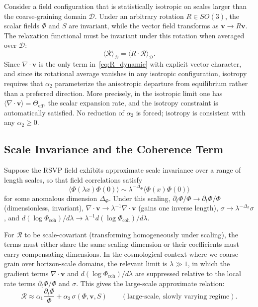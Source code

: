 \documentclass[12pt,a4paper]{article}
\theoremstyle{remark}
\newcommand{\vv}{\mathbf{v}}
\newcommand{\Rcal}{\mathcal{R}}
\begin{document}
Consider a field configuration that is statistically isotropic on scales
larger than the coarse-graining domain $\mathcal{D}$. Under an arbitrary
rotation $R \in SO(3)$, the scalar fields $\Phi$ and $S$ are invariant,
while the vector field transforms as $\vv \to R\vv$. The relaxation functional
must be invariant under this rotation when averaged over $\mathcal{D}$:
\begin{equation}
\langle \Rcal \rangle_{\mathcal{D}} = \langle R\cdot\Rcal \rangle_{\mathcal{D}}.
\end{equation}
Since $\nabla \cdot \vv$ is the only term in~\eqref{eq:R_dynamic} with explicit
vector character, and since its rotational average vanishes in any isotropic
configuration, isotropy requires that $\alpha_2$ parameterize the anisotropic
departure from equilibrium rather than a preferred direction. More precisely,
in the isotropic limit one has $\langle \nabla \cdot \vv \rangle = \Theta_{\mathrm{eff}}$,
the scalar expansion rate, and the isotropy constraint is automatically
satisfied. No reduction of $\alpha_2$ is forced; isotropy is consistent with
any $\alpha_2 \ge 0$.

\subsection{Scale Invariance and the Coherence Term}

Suppose the RSVP field exhibits approximate scale invariance over a range of
length scales, so that field correlations satisfy
\begin{equation}
\langle \Phi(\lambda x) \Phi(0) \rangle \sim \lambda^{-\Delta_\Phi}
\langle \Phi(x)\Phi(0) \rangle
\end{equation}
for some anomalous dimension $\Delta_\Phi$. Under this scaling,
$\partial_t\Phi/\Phi \to \partial_t\Phi/\Phi$ (dimensionless, invariant),
$\nabla\cdot\vv \to \lambda^{-1}\nabla\cdot\vv$ (gains one inverse length),
$\sigma \to \lambda^{-\Delta_\sigma}\sigma$, and $d(\log\Phi_{\mathrm{coh}})/d\lambda
\to \lambda^{-1}d(\log\Phi_{\mathrm{coh}})/d\lambda$.

For $\Rcal$ to be scale-covariant (transforming homogeneously under scaling),
the terms must either share the same scaling dimension or their coefficients
must carry compensating dimensions. In the cosmological context where we
coarse-grain over horizon-scale domains, the relevant limit is $\lambda \gg 1$,
in which the gradient terms $\nabla\cdot\vv$ and $d(\log\Phi_{\mathrm{coh}})/d\lambda$
are suppressed relative to the local rate terms $\partial_t\Phi/\Phi$ and $\sigma$.
This gives the large-scale approximate relation:
\begin{equation}
\Rcal \approx \alpha_1 \frac{\partial_t\Phi}{\Phi} + \alpha_3\,\sigma(\Phi,\vv,S)
\qquad (\text{large-scale, slowly varying regime}).
\label{eq:R_largescale}
\end{equation}
\end{document}
